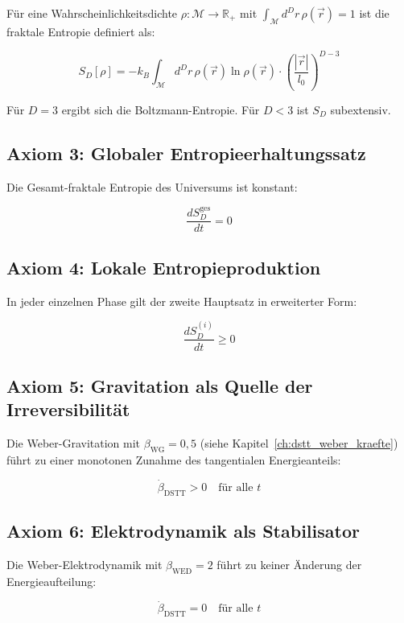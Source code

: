 Für eine Wahrscheinlichkeitsdichte \( \rho: \mathcal{M} \to \mathbb{R}_+ \) mit \( \int_{\mathcal{M}} d^D r \, \rho(\vec{r}) = 1 \) ist die fraktale Entropie definiert als:

\[
S_D[\rho] = -k_B \int_{\mathcal{M}} d^D r \, \rho(\vec{r}) \ln \rho(\vec{r}) \cdot \left( \frac{|\vec{r}|}{l_0} \right)^{D-3} \tag{L.2}
\]

Für \( D = 3 \) ergibt sich die Boltzmann-Entropie. Für \( D < 3 \) ist \( S_D \) subextensiv.

\subsection{Axiom 3: Globaler Entropieerhaltungssatz}
\label{sub:fraktale_entropie_axiom3}

Die Gesamt-fraktale Entropie des Universums ist konstant:

\[
\frac{dS_D^{\text{ges}}}{dt} = 0 \tag{L.3}
\]

\subsection{Axiom 4: Lokale Entropieproduktion}
\label{sub:fraktale_entropie_axiom4}

In jeder einzelnen Phase gilt der zweite Hauptsatz in erweiterter Form:

\[
\frac{dS_D^{(i)}}{dt} \geq 0 \tag{L.4}
\]

\subsection{Axiom 5: Gravitation als Quelle der Irreversibilität}
\label{sub:fraktale_entropie_axiom5}

Die Weber-Gravitation mit \( \beta_{\text{WG}} = 0,5 \) (siehe Kapitel~\ref{ch:dstt_weber_kraefte}) führt zu einer monotonen Zunahme des tangentialen Energieanteils:

\[
\dot{\beta}_{\text{DSTT}} > 0 \quad \text{für alle } t \tag{L.5}
\]

\subsection{Axiom 6: Elektrodynamik als Stabilisator}
\label{sub:fraktale_entropie_axiom6}

Die Weber-Elektrodynamik mit \( \beta_{\text{WED}} = 2 \) führt zu keiner Änderung der Energieaufteilung:

\[
\dot{\beta}_{\text{DSTT}} = 0 \quad \text{für alle } t \tag{L.6}
\]

